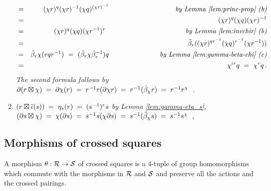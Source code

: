 \begin{example}
\begin{enumerate}[{\rm (a)}]
\begin{eqnarray*}
 & = & (\chi r)^q (\chi r)^{-1} (\chi q)^{(\chi r)^{-1}} 
        \hspace{33mm} \mbox{\emph{ by Lemma \ref{lem:princ-prop} (b)}} \\
 & = & (\chi r)^q (\chi q) (\chi r)^{-1} \\
 & = & (\chi r)^q (\chi q) (\chi r^{-1})^r 
        \hspace{40mm} \mbox{\emph{ by Lemma \ref{lem:invchir} (b)}}    \\
 & = & \ddb_r((\chi r)^{qr^{-1}} (\chi q)^{r^{-1}} (\chi r^{-1})) \\
 & = & \ddb_r \chi(rqr^{-1})
   ~=~ (\ddb_r\chi\db_r^{-1})q
        \hspace{25mm} \mbox{\emph{ by Lemma \ref{lem:gamma-beta-chi} (c)}} \\
 & = & \chi^{\di r}q
   ~=~ \chi^r q\,.
\end{eqnarray*}
\emph{The second formula follows by}\\
\hspace*{4mm}$\partial (r \boxtimes \chi) 
  \;=\; \partial \chi(r) 
  \;=\; r^{-1} r (\partial \chi r) 
  \;=\; r^{-1} (\dot{\beta}_{\chi} r) 
  \;=\; r^{-1} r^{\chi}$~.
\item
\quad $(r \boxtimes \ddot{\iota}(s)) \;=\; \eta_{s}(r) \;=\; (s^{-1})^r s$
  \hspace{60mm} \emph{by Lemma \ref{lem:gamma-eta_s},} \\
\hspace*{4mm}$(\partial s \boxtimes \chi) 
  \;=\; \chi(\partial s) 
  \;=\; s^{-1} s (\chi\partial s) 
  \;=\; s^{-1} (\ddot{\beta}_{\chi} s) 
  \;=\; s^{-1} s^{\chi}$~, \\
\end{enumerate}
\end{example}


\newpage
\subsection{Morphisms of crossed squares} 

A morphism $\theta : \mathcal{R} \to \mathcal{S}$ of crossed squares 
is a $4$-tuple of group homomorphisms which commute with the
morphisms in $\mathcal{R}$ and $\mathcal{S}$ and preserve all the actions
and the crossed pairings.

